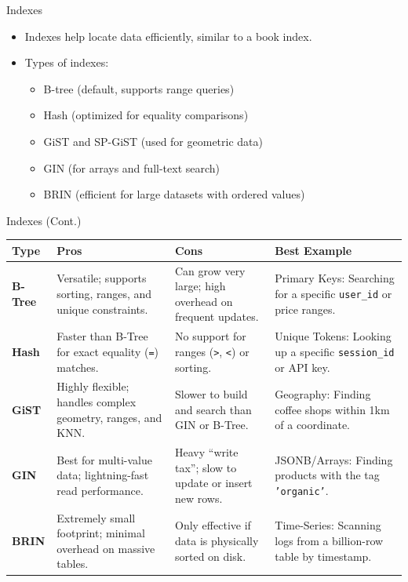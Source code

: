\documentclass[aspectratio=169]{beamer}
\begin{document}
\begin{frame}{Indexes}
    \begin{itemize}
        \item Indexes help locate data efficiently, similar to a book index.
        \item Types of indexes:
        \begin{itemize}
            \item B-tree (default, supports range queries)
            \item Hash (optimized for equality comparisons)
            \item GiST and SP-GiST (used for geometric data)
            \item GIN (for arrays and full-text search)
            \item BRIN (efficient for large datasets with ordered values)
        \end{itemize}
    \end{itemize}
\end{frame}

\begin{frame}{Indexes (Cont.)}
  \centering
  \scriptsize
  \begin{tabularx}{\textwidth}{@{} l >{\raggedright\arraybackslash}X >{\raggedright\arraybackslash}X >{\raggedright\arraybackslash}X @{}}
    \toprule
      \textbf{Type} & \textbf{Pros} & \textbf{Cons} & \textbf{Best Example} \\
    \midrule
      \textbf{B-Tree} & Versatile; supports sorting, ranges, and unique constraints. & Can grow very large; high overhead on frequent updates. & Primary Keys: Searching for a specific \texttt{user\_id} or price ranges. \\
      \textbf{Hash} & Faster than B-Tree for exact equality (\texttt{=}) matches. & No support for ranges (\texttt{>}, \texttt{<}) or sorting. & Unique Tokens: Looking up a specific \texttt{session\_id} or API key. \\
      \textbf{GiST} & Highly flexible; handles complex geometry, ranges, and KNN. & Slower to build and search than GIN or B-Tree. & Geography: Finding coffee shops within 1km of a coordinate. \\
      \textbf{GIN} & Best for multi-value data; lightning-fast read performance. & Heavy ``write tax''; slow to update or insert new rows. & JSONB/Arrays: Finding products with the tag \texttt{'organic'}. \\
      \textbf{BRIN} & Extremely small footprint; minimal overhead on massive tables. & Only effective if data is physically sorted on disk. & Time-Series: Scanning logs from a billion-row table by timestamp. \\
    \bottomrule
  \end{tabularx}
\end{frame}
\end{document}
